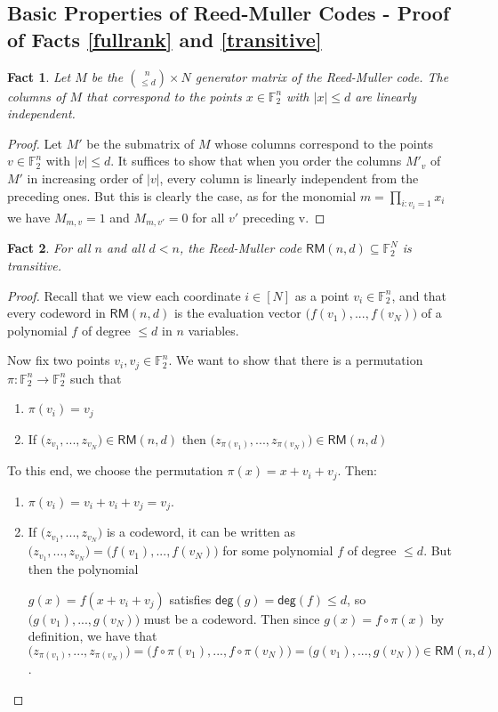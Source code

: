 \documentclass[12pt]{article}
\newtheorem*{fact*}{Fact}
\newcommand{\F}{\mathbb{F}}
\begin{document}
\subsection{Basic Properties of Reed-Muller Codes - Proof of Facts \ref{fullrank} and \ref{transitive}}\label{afullrank}
\begin{fact*} Let $M$ be the $ \binom{n}{\leq d}\times N$ generator matrix of the Reed-Muller code. The columns of $M$ that correspond to the points $x \in \F_2^n$ with $|x| \leq d$ are linearly independent.
\end{fact*}
\begin{proof}
Let $M'$ be the submatrix of $M$ whose columns correspond to the points $v \in \F_2^n$ with $|v| \leq d$. It suffices to show that when you order the columns $M'_v$ of $M'$ in increasing order of $|v|$, every column is linearly independent from the preceding ones. But this is clearly the case, as for the monomial $m=\prod_{i:v_i=1}x_i$ we have $M_{m,v}=1$ and $M_{m,v'}=0$ for all $v'$ preceding v.
\end{proof}
\begin{fact*}
For all $n$ and all $d<n$, the Reed-Muller code $\mathsf{RM}(n,d)\subseteq\mathbb{F}_2^N$ is transitive.
\end{fact*}

\begin{proof}
Recall that we view each coordinate $i\in[N]$ as a point $v_i\in\mathbb{F}_2^n$, and that every codeword in $\mathsf{RM}(n,d)$ is the evaluation vector $\big(f(v_1),...,f(v_N)\big)$ of a polynomial $f$ of degree $\leq d$ in $n$ variables. 

Now fix two points $v_i,v_j\in \mathbb{F}_2^n$. We want to show that there is a permutation $\pi:\mathbb{F}_2^n\rightarrow \mathbb{F}_2^n$ such that

\begin{enumerate}[label=(\roman*)]
    \item $\pi(v_i)=v_j$
    \item If $\big(z_{v_1},...,z_{v_N}\big)\in \mathsf{RM}(n,d)$ then $\big(z_{\pi(v_1)},...,z_{\pi(v_N)}\big)\in \mathsf{RM}(n,d)$
\end{enumerate}
To this end, we choose the permutation $\pi(x)=x+v_i+v_j$. Then:
\begin{enumerate}[label=(\roman*)]
\item $\pi(v_i)=v_i+v_i+v_j=v_j$.
\item If $\big(z_{v_1},...,z_{v_N}\big)$ is a codeword, it can be written as $\big(z_{v_1},...,z_{v_N}\big)=\big(f(v_1),...,f(v_N)\big)$ for some polynomial $f$ of degree $\leq d$. But then the polynomial 

$g(x)=f(x+v_i+v_j)$ satisfies $\mathsf{deg}(g)=\mathsf{deg}(f)\leq d$, so $\big(g(v_1),...,g(v_N)\big)$ must be a codeword. Then since $g(x)=f \circ \pi(x)$ by definition, we have that $\big(z_{\pi(v_1)},...,z_{\pi(v_N)}\big)=\big(f\circ\pi(v_1),...,f\circ\pi(v_N)\big)=\big(g(v_1),...,g(v_N)\big)\in\mathsf{RM}(n,d)$. 
\end{enumerate}
\end{proof}
\end{document}

